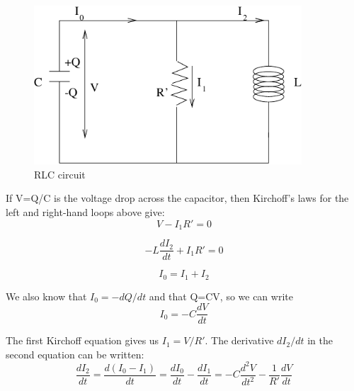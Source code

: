 \documentclass[makesolutionspdf]{esg8022pset}
\begin{document}
\begin{solution}
  \begin{figure}[H]
    \centering
    \includegraphics[width = 10cm]{ps8}
    \caption{RLC circuit}
    \label{fig:graph22.eps}
  \end{figure}

  If V=Q/C is the voltage drop across the capacitor, then Kirchoff's
  laws for the left and right-hand loops above give:
  \begin{equation}
  V-I_1R'=0
  \end{equation}

  \begin{equation}
  -L\frac{dI_2}{dt}+I_1R'=0
  \end{equation}

  \begin{equation}
  I_0=I_1+I_2
  \end{equation}

  We also know that $I_0=-dQ/dt$ and that Q=CV, so we can write
  \begin{equation}
  I_0=-C\frac{dV}{dt}
  \end{equation}

  The first Kirchoff equation gives us $I_1=V/R'$. The derivative
  $dI_2/dt$ in the second equation can be written:
  \begin{equation}
  \frac{dI_2}{dt}=\frac{d(I_0-I_1)}{dt}=\frac{dI_0}{dt}-\frac{dI_1}{dt}=-C\frac{d^2V}{dt^2}-\frac{1}{R'}\frac{dV}{dt}
  \end{equation}


\end{solution}
\end{document}
